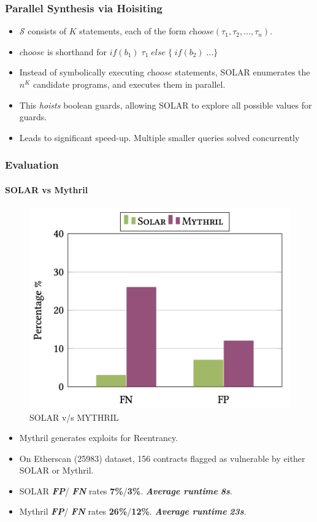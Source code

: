 \documentclass{beamer}
\newcommand{\hole}{\textit{choose}}
\newcommand{\boldIt}[1]{\textbf{\textit{#1}}}
\begin{document}
\begin{frame}[fragile]
  \frametitle{Parallel Synthesis via Hoisiting}
  \begin{itemize}
    \item $\mathcal{S}$ consists of $K$ statements, each of the form
        $\hole(\tau_1, \tau_2, \dots, \tau_n)$.
      \item $\hole$ is shorthand for $\textit{if}(b_1)\; \tau_1\;
        \textit{else}\; \{\; \textit{if}(b_2)\; \dots \}$
      \item Instead of symbolically executing $\hole$ statements,
        SOLAR enumerates the $n^K$ candidate programs, and
        executes them in parallel.
      \item This \textit{hoists} boolean guards, allowing SOLAR
        to explore all possible values for guards.
      \item Leads to significant speed-up.
        Multiple smaller queries solved concurrently
  \end{itemize}
\end{frame}



\begin{frame}[fragile]
  \frametitle{Evaluation}
  \framesubtitle{SOLAR vs Mythril}
  \begin{figure}
    \centering
    \includegraphics[scale=0.25]{evaluationMythril}
    \caption{SOLAR v/s MYTHRIL}
  \end{figure}
  \begin{itemize}
    \item Mythril generates exploits for Reentrancy.
    \item On Etherscan (25983) dataset, 156 contracts flagged
      as vulnerable by either SOLAR or Mythril.
    \item SOLAR \boldIt{FP}/ \boldIt{FN} rates \textbf{7\%}/\textbf{3\%}.
      \boldIt{Average runtime} \boldIt{8s}.
    \item Mythril \boldIt{FP}/ \boldIt{FN} rates \textbf{26\%}/\textbf{12\%}.
      \boldIt{Average runtime} \boldIt{23s}.
  \end{itemize}
\end{frame}
\end{document}

